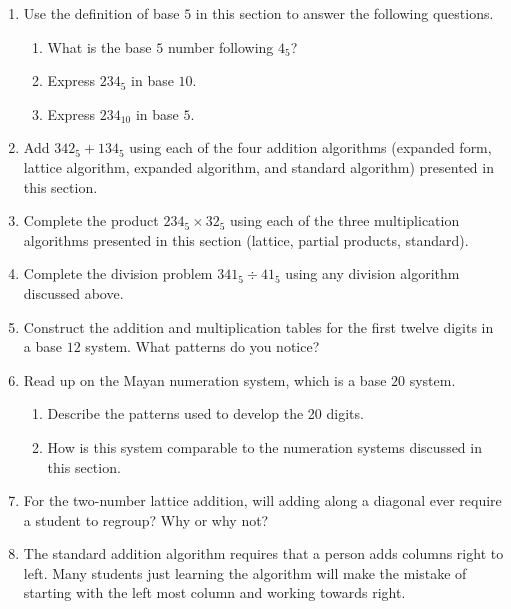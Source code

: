 \documentclass[
]{book}
\providecommand{\tightlist}{%
  \setlength{\itemsep}{0pt}\setlength{\parskip}{0pt}}
\theoremstyle{definition}
\theoremstyle{definition}
\theoremstyle{definition}
\theoremstyle{definition}
\theoremstyle{remark}
\begin{document}
\begin{enumerate}
\def\labelenumi{\arabic{enumi}.}
\item
  Use the definition of base \(5\) in this section to answer the following questions.

  \begin{enumerate}
  \def\labelenumii{\alph{enumii}.}
  \tightlist
  \item
    What is the base \(5\) number following \(4_{5}\)?
  \item
    Express \(234_{5}\) in base \(10\).
  \item
    Express \(234_{10}\) in base \(5\).
  \end{enumerate}
\item
  Add \(342_5+134_5\) using each of the four addition algorithms (expanded form, lattice algorithm, expanded algorithm, and standard algorithm) presented in this section.
\item
  Complete the product \(234_5 \times 32_5\) using each of the three multiplication algorithms presented in this section (lattice, partial products, standard).
\item
  Complete the division problem \(341_5 \div 41_5\) using any division algorithm discussed above.
\item
  Construct the addition and multiplication tables for the first twelve digits in a base \(12\) system. What patterns do you notice?
\item
  Read up on the Mayan numeration system, which is a base \(20\) system.

  \begin{enumerate}
  \def\labelenumii{\alph{enumii}.}
  \tightlist
  \item
    Describe the patterns used to develop the 20 digits.
  \item
    How is this system comparable to the numeration systems discussed in this section.
  \end{enumerate}
\item
  For the two-number lattice addition, will adding along a diagonal ever require a student to regroup? Why or why not?
\item
  The standard addition algorithm requires that a person adds columns right to left. Many students just learning the algorithm will make the mistake of starting with the left most column and working towards right.


\end{enumerate}
\end{document}
